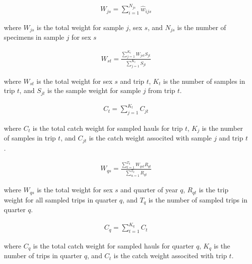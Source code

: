 \begin{align} \label{eq:samplewt}
W_{js}=\sum_{i=1}^{N_{js}}\hat{w}_{ijs}
\end{align}
\begin{addmargin}[3em]{1em}
where $W_{js}$ is the total weight for sample $j$, sex $s$, and $N_{js}$ is the number of specimens in sample $j$ for sex $s$
\end{addmargin}

\begin{align} \label{eq:totaltripwt}
W_{st}=\frac{\sum\limits_{j=1}^{K_t}W_{jst}S_{jt}}{\sum\limits_{j=1}^{K_t}S_{jt}}
\end{align}
\begin{addmargin}[3em]{1em}
where $W_{st}$ is the total weight for sex $s$ and trip $t$, $K_t$ is the number of samples in trip $t$, and $S_{jt}$ is the sample weight for sample $j$ from trip $t$.
\end{addmargin}

\begin{align} \label{eq:totaltripcatchwt}
C_t=\sum\limits_{j=1}^{K_t}C_{jt}
\end{align}
\begin{addmargin}[3em]{1em}
where $C_t$ is the total catch weight for sampled hauls for trip $t$, $K_j$ is the number of samples in trip $t$, and $C_{jt}$ is the catch weight associted with sample $j$ and trip $t$.
\end{addmargin}

\begin{align} \label{eq:totalquarterwt}
W_{qs}=\frac{\sum\limits_{t=1}^{T_q}W_{qst}R_{qt}}{\sum\limits_{n=1}^{T_q}R_{qt}}
\end{align}
\begin{addmargin}[3em]{1em}
where $W_{qs}$ is the total weight for sex $s$ and quarter of year $q$, $R_{qt}$ is the trip weight for all sampled trips in quarter $q$,
and $T_q$ is the number of sampled trips in quarter $q$.
\end{addmargin}

\begin{align} \label{eq:totalquartercatchwt}
C_q=\sum\limits_{t=1}^{K_q}C_{t}
\end{align}
\begin{addmargin}[3em]{1em}
where $C_q$ is the total catch weight for sampled hauls for quarter $q$, $K_q$ is the number of trips in quarter $q$, and $C_t$ is the catch weight associted with trip $t$.
\end{addmargin}

